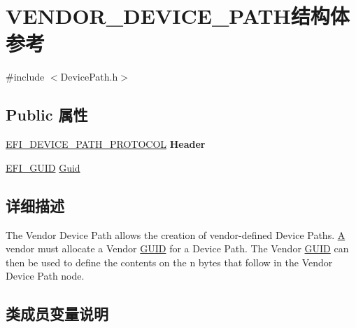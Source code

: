 \hypertarget{struct_v_e_n_d_o_r___d_e_v_i_c_e___p_a_t_h}{}\section{V\+E\+N\+D\+O\+R\+\_\+\+D\+E\+V\+I\+C\+E\+\_\+\+P\+A\+T\+H结构体 参考}
\label{struct_v_e_n_d_o_r___d_e_v_i_c_e___p_a_t_h}


{\ttfamily \#include $<$Device\+Path.\+h$>$}

\subsection*{Public 属性}
\begin{DoxyCompactItemize}
\item 
\mbox{\label{struct_v_e_n_d_o_r___d_e_v_i_c_e___p_a_t_h_a02fca2b04d5243ddf80dd30f60d72c5a}} 
\hyperlink{struct_e_f_i___d_e_v_i_c_e___p_a_t_h___p_r_o_t_o_c_o_l}{E\+F\+I\+\_\+\+D\+E\+V\+I\+C\+E\+\_\+\+P\+A\+T\+H\+\_\+\+P\+R\+O\+T\+O\+C\+OL} {\bfseries Header}
\item 
\hyperlink{_uefi_base_type_8h_ad87614428813f71edb2c2d802e9ce2af}{E\+F\+I\+\_\+\+G\+U\+ID} \hyperlink{struct_v_e_n_d_o_r___d_e_v_i_c_e___p_a_t_h_ac48fc85d4a6254f12ad33aaec16c7d41}{Guid}
\end{DoxyCompactItemize}


\subsection{详细描述}
The Vendor Device Path allows the creation of vendor-\/defined Device Paths. \hyperlink{struct_a}{A} vendor must allocate a Vendor \hyperlink{interface_g_u_i_d}{G\+U\+ID} for a Device Path. The Vendor \hyperlink{interface_g_u_i_d}{G\+U\+ID} can then be used to define the contents on the n bytes that follow in the Vendor Device Path node. 

\subsection{类成员变量说明}
\mbox{\label{struct_v_e_n_d_o_r___d_e_v_i_c_e___p_a_t_h_ac48fc85d4a6254f12ad33aaec16c7d41}} 
